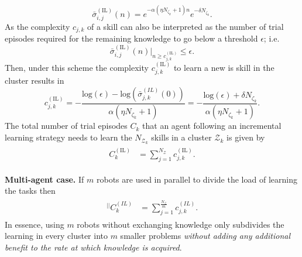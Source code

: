 \begin{equation*}\label{eq:remaining_knowledge__IL}
	\bar{\sigma}^{(\text{IL})}_{i,j}(n) = e^{-\alpha  \left(\eta N_{\zeta_k}+1\right) n} e^{-\delta N_{\zeta_k}}.
\end{equation*}
As the complexity $c_{j,k}$ of a skill can also be interpreted as the number of trial episodes required for the remaining knowledge to go below a threshold $\epsilon$; i.e.
\begin{equation*}
	\bar{\sigma}^{(\text{IL})}_{i,j}(n) \Big \rvert_{n \ge c^{(\text{IL})}_{j,k}} \leq \epsilon.
\end{equation*}
Then, under this scheme the complexity $c^{(\text{IL})}_{j,k}$ to learn a new is skill in the cluster results in
\begin{equation}\label{eq:complexity_IL}
	c^{(\text{IL})}_{j,k} = -\frac{\text{log}(\epsilon) - \text{log}\left(\bar{\sigma}^{(IL)}_{j,k}(0)\right)}{\alpha (\eta N_{\zeta_k}+ 1)} = -\frac{\text{log}(\epsilon) + \delta N_{\zeta_k}}{\alpha (\eta N_{\zeta_k}+ 1)}  .
\end{equation}
The total number of trial episodes $ C_k $ that an agent following an incremental learning strategy needs to learn the $N_{\mathcal{Z}_k}$ skills in a cluster $ \mathcal{Z}_k $ is given by
\begin{align}\label{eq:total_episodes_incremental}
	\begin{split}
		C^{(\text{IL})}_k &= \sum^{N_{\mathcal{Z}}}_{j=1} c^{(\text{IL})}_{j,k}.
	\end{split}
\end{align}

\textbf{Multi-agent case.} If $m$ robots are used in parallel to divide the load of learning the tasks then
\begin{align}
	\begin{split}
		{}^{\lvert \rvert}C^{(IL)}_k &= \sum^{\frac{N_{\mathcal{Z}}}{m}}_{j=1} c^{(IL)}_{j,k}.
	\end{split}
\end{align}
In essence, using $m$ robots without exchanging knowledge only subdivides the learning in every cluster into $m$ smaller problems \emph{without adding any additional benefit to the rate at which knowledge is acquired}. 

